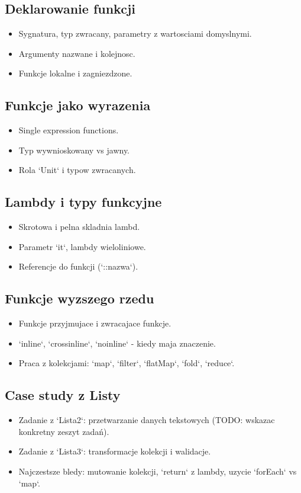 \subsection{Deklarowanie funkcji}
\begin{itemize}
  \item Sygnatura, typ zwracany, parametry z wartosciami domyslnymi.
  \item Argumenty nazwane i kolejnosc.
  \item Funkcje lokalne i zagniezdzone.
\end{itemize}

\subsection{Funkcje jako wyrazenia}
\begin{itemize}
  \item Single expression functions.
  \item Typ wywnioskowany vs jawny.
  \item Rola `Unit` i typow zwracanych.
\end{itemize}

\subsection{Lambdy i typy funkcyjne}
\begin{itemize}
  \item Skrotowa i pelna skladnia lambd.
  \item Parametr `it`, lambdy wieloliniowe.
  \item Referencje do funkcji (`::nazwa`).
\end{itemize}

\subsection{Funkcje wyzszego rzedu}
\begin{itemize}
  \item Funkcje przyjmujace i zwracajace funkcje.
  \item `inline`, `crossinline`, `noinline` - kiedy maja znaczenie.
  \item Praca z kolekcjami: `map`, `filter`, `flatMap`, `fold`, `reduce`.
\end{itemize}

\subsection{Case study z Listy}
\begin{itemize}
  \item Zadanie z `Lista2`: przetwarzanie danych tekstowych (TODO: wskazac konkretny zeszyt zadań).
  \item Zadanie z `Lista3`: transformacje kolekcji i walidacje.
  \item Najczestsze bledy: mutowanie kolekcji, `return` z lambdy, uzycie `forEach` vs `map`.
\end{itemize}

